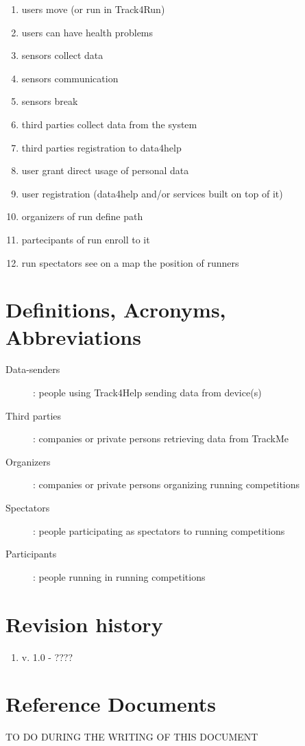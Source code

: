 \documentclass{report}
\begin{document}
		\begin{enumerate}
		\item users move (or run in Track4Run)
		\item users can have health problems
		\item sensors collect data
		\item sensors communication
		\item sensors break
		\item third parties collect data from the system
		\item third parties registration to data4help
		\item user grant direct usage of personal data
		\item user registration (data4help and/or services built on top of it)
		\item organizers of run define path
		\item partecipants of run enroll to it
		\item run spectators see on a map the position of runners
		
		\end{enumerate}
		\section{Definitions, Acronyms, Abbreviations}
		\begin{description}
			\item[Data-senders]: people using Track4Help sending data from device(s)
			\item[Third parties]: companies or private persons retrieving data from TrackMe
			\item[Organizers]: companies or private persons organizing running competitions
			\item[Spectators]: people participating as spectators to running competitions
			\item[Participants]: people running in running competitions
		\end{description}
		
		\section{Revision history}
		\begin{enumerate}
			\item v. 1.0 - ????
		\end{enumerate}
		\section{Reference Documents}
		TO DO DURING THE WRITING OF THIS DOCUMENT
\end{document}
